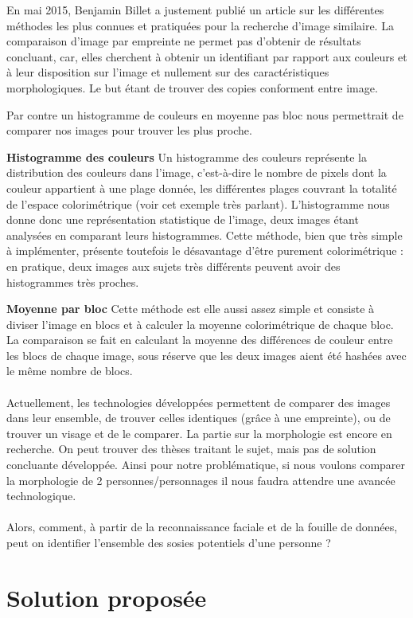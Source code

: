 \documentclass[a4paper,12pt]{article}
\begin{document}
En mai 2015, Benjamin Billet a justement publié un article sur les différentes méthodes les plus connues et pratiquées pour la recherche d'image similaire. La comparaison d'image par empreinte ne permet pas d'obtenir de résultats concluant, car, elles cherchent à obtenir un identifiant par rapport aux couleurs et à leur disposition sur l'image et nullement sur des caractéristiques morphologiques. Le but étant de trouver des copies conforment entre image. 

Par contre un histogramme de couleurs en moyenne pas bloc nous permettrait de comparer nos images pour trouver les plus proche. 

\textbf{Histogramme des couleurs}
Un histogramme des couleurs représente la distribution des couleurs dans l'image, c'est-à-dire le nombre de pixels dont la couleur appartient à une plage donnée, les différentes plages couvrant la totalité de l'espace colorimétrique (voir cet exemple très parlant). L'histogramme nous donne donc une représentation statistique de l'image, deux images étant analysées en comparant leurs histogrammes. Cette méthode, bien que très simple à implémenter, présente toutefois le désavantage d'être purement colorimétrique : en pratique, deux images aux sujets très différents peuvent avoir des histogrammes très proches.

\textbf{Moyenne par bloc}
Cette méthode est elle aussi assez simple et consiste à diviser l'image en blocs et à calculer la moyenne colorimétrique de chaque bloc. La comparaison se fait en calculant la moyenne des différences de couleur entre les blocs de chaque image, sous réserve que les deux images aient été hashées avec le même nombre de blocs. 
\\\\
Actuellement, les technologies développées permettent de comparer des images dans leur ensemble, de trouver celles identiques (grâce à une empreinte), ou de trouver un visage et de le comparer. La partie sur la morphologie est encore en recherche. On peut trouver des thèses traitant le sujet, mais pas de solution concluante développée. Ainsi pour notre problématique, si nous voulons comparer la morphologie de 2 personnes/personnages il nous faudra attendre une avancée technologique. 
\\\\
Alors, comment, à partir de la reconnaissance faciale et de la fouille de données, peut on identifier l’ensemble des sosies potentiels d’une personne ?
\section{Solution proposée}
\end{document}
